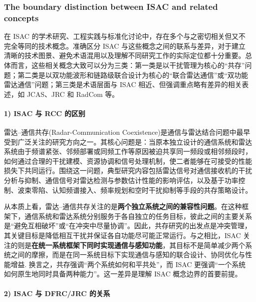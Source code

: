 \subsubsection{The boundary distinction between ISAC and related concepts}
\label{subsubsec:ch1-boundary-distinction}

在 ISAC 的学术研究、工程实践与标准化讨论中，存在多个与之密切相关但又不完全等同的技术概念。准确区分 ISAC 与这些概念之间的联系与差异，对于建立清晰的技术图景、避免术语混用以及理解不同研究工作的实际定位都十分重要。总体而言，这些相关概念大致可以分为三类：第一类是以干扰管理为核心的“共存”问题；第二类是以双功能波形和链路级联合设计为核心的“联合雷达通信”或“双功能雷达通信”问题；第三类是术语层面与 ISAC 相近、但强调重点略有差异的相关表述，如 JCAS、JRC 和 RadCom 等。

\paragraph{1) ISAC 与 RCC 的区别}

雷达--通信共存(Radar-Communication Coexistence)是通信与雷达结合问题中最早受到广泛关注的研究方向之一。其核心问题是：当原本独立设计的通信系统和雷达系统由于频谱紧张、邻频部署或同频工作等原因被迫共享同一频段或相邻频段时，如何通过合理的干扰建模、资源协调和信号处理机制，使二者能够在可接受的性能损失下共同运行\cite{Chiriyath2017RadarCommCoexistence,Liu2020JointRadarComm}。围绕这一问题，典型研究内容包括雷达信号对通信接收机的干扰分析与抑制、通信信号对雷达检测与参数估计性能的影响评估，以及基于功率控制、波束零陷、认知频谱接入、频率规划和空时干扰抑制等手段的共存策略设计\cite{Deng2013InterferenceMitigation,Sodagari2012ProjectionBasedCoexistence,Zheng2019RadarCommunicationCoexistence}。

从本质上看，雷达--通信共存关注的是\textbf{两个独立系统之间的兼容性问题}。在这种框架下，通信系统和雷达系统分别服务于各自独立的任务目标，彼此之间的主要关系是“避免互相破坏”或“在冲突中尽量协调”。因此，共存研究的出发点是冲突管理，其关键目标是降低相互干扰并保证各自功能尽可能正常运行。与之相比，ISAC 关注的则是\textbf{在统一系统框架下同时实现通信与感知功能}，其目标不是简单减少两个系统之间的摩擦，而是在同一系统目标下实现通信与感知的联合设计、协同优化与性能增益\cite{Liu2022ISAC}. 换言之，共存强调“两个系统如何和平共处”，而 ISAC 更强调“一个系统如何原生地同时具备两种能力”。这一差异是理解 ISAC 概念边界的首要前提。

\paragraph{2) ISAC 与 DFRC/JRC 的关系}

